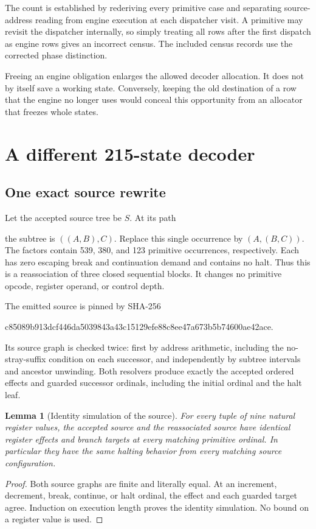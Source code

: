 \documentclass[11pt]{article}
\newtheorem{lemma}[theorem]{Lemma}
\theoremstyle{definition}
\begin{document}
The count is established by rederiving every primitive case and separating
source-address reading from engine execution at each dispatcher visit.
A primitive may revisit the dispatcher internally, so simply treating all
rows after the first dispatch as engine rows gives an incorrect census.
The included census records use the corrected phase distinction.

Freeing an engine obligation enlarges the allowed decoder allocation. It
does not by itself save a working state. Conversely, keeping the old
destination of a row that the engine no longer uses would conceal this
opportunity from an allocator that freezes whole states.

\section{A different 215-state decoder}
\label{sec:shallow}

\subsection{One exact source rewrite}

Let the accepted source tree be \(S\). At its path
\begin{center}\end{center}
the subtree is \(((A,B),C)\). Replace this single occurrence by
\((A,(B,C))\). The factors contain 539, 380, and 123 primitive occurrences,
respectively. Each has zero escaping break and continuation demand and
contains no halt. Thus this is a reassociation of three closed sequential
blocks. It changes no primitive opcode, register operand, or control depth.

The emitted source is pinned by SHA-256
\begin{center}\footnotesize\ttfamily
c85089b913dcf446da5039843a43c15129efe88c8ee47a673b5b74600ae42ace.
\end{center}
Its source graph is checked twice: first by address arithmetic, including
the no-stray-suffix condition on each successor, and independently by
subtree intervals and ancestor unwinding. Both resolvers produce exactly
the accepted ordered effects and guarded successor ordinals, including
the initial ordinal and the halt leaf.

\begin{lemma}[Identity simulation of the source]
For every tuple of nine natural register values, the accepted source and
the reassociated source have identical register effects and branch targets
at every matching primitive ordinal. In particular they have the same
halting behavior from every matching source configuration.
\end{lemma}
\begin{proof}
Both source graphs are finite and literally equal. At an increment,
decrement, break, continue, or halt ordinal, the effect and each guarded
target agree. Induction on execution length proves the identity
simulation. No bound on a register value is used.
\end{proof}
\end{document}
